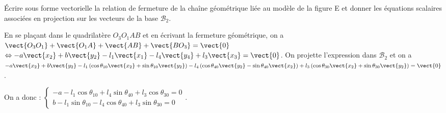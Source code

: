 \documentclass[11pt]{article}
\begin{document}
\UPSTIquestion  Écrire sous forme vectorielle la relation de fermeture de la chaîne géométrique liée au modèle de la
figure E et donner les équations scalaires associées en projection sur les vecteurs de la base $\mathcal{B}_2$.

\begin{UPSTIcorrige}
En se plaçant dans le quadrilatère $O_3O_1AB$ et en écrivant la fermeture géométrique, on a 
$\vect{O_3 O_1} + \vect{O_1 A} + \vect{AB} + \vect{BO_3}  = \vect{0}$
$\Leftrightarrow -a \vect{x_2} + b\vect{y_2} -l_1 \vect{x_1} -l_4 \vect{y_4} + l_3 \vect{x_3} = \vect{0}$. On projette l'expression dans $\mathcal{B}_2$ et  on a
$-a \vect{x_2} + b\vect{y_2} -l_1 \left(\cos\theta_{10} \vect{x_2} + \sin\theta_{10} \vect{y_2}  \right)-l_4 \left( 
\cos \theta_{40} \vect{y_2} - \sin\theta_{40} \vect{x_2} \right) + l_3 \left(\cos\theta_{30} \vect{x_2} + \sin\theta_{30} \vect{y_2}  \right)= \vect{0}$.

On a donc  :
$
\left\{ 
\begin{array}{l}
-a  -l_1 \cos\theta_{10} + l_4   \sin\theta_{40}   + l_3 \cos\theta_{30} = 0 \\
 b -l_1  \sin\theta_{10} -l_4  \cos \theta_{40}  + l_3  \sin\theta_{30}   =0
\end{array}
\right.
$.


%
%
%
%
%


\end{UPSTIcorrige}
\end{document}
